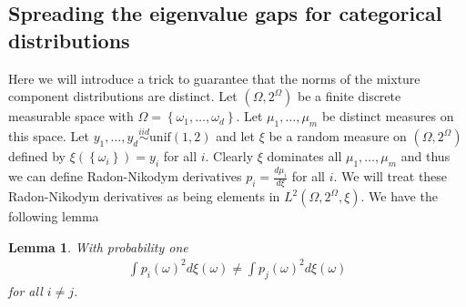 \documentclass[aos,preprint]{imsart}
\def\l{\left}
\def\r{\right}
\def\simiid{\overset{iid}{\sim}}
\theoremstyle{plain}
\newtheorem{lem}{Lemma}[section]
\theoremstyle{defintion}
\begin{document}
\subsection{Spreading the eigenvalue gaps for categorical distributions} \label{sec:eigspread}
Here we will introduce a trick to guarantee that the norms of the mixture component distributions are distinct. Let $\left( \Omega, 2^\Omega \right)$ be a finite discrete measurable space with $\Omega = \l\{\omega_1,\ldots,\omega_d\r\}$. Let $\mu_1,\ldots,\mu_m$ be distinct measures on this space. Let $y_1,\ldots, y_d\simiid \text{unif}\left( 1,2 \right)$ and let $\xi$ be a random measure on $\left( \Omega,2^\Omega \right)$ defined by $\xi\l(\left\{ \omega_i \right\}\r) = y_i$ for all $i$. Clearly $\xi$ dominates all $\mu_1,\ldots,\mu_m$ and thus we can define Radon-Nikodym derivatives $p_i = \frac{d\mu_i}{d \xi}$ for all $i$. We will treat these Radon-Nikodym derivatives as being elements in $L^2\left( \Omega, 2^\Omega, \xi \right)$. We have the following lemma
\begin{lem} \label{lem:distinctnorm}
	With probability one
	\begin{eqnarray*}
		\int p_i(\omega)^2 d\xi(\omega) \neq \int p_j(\omega)^2 d\xi(\omega)
	\end{eqnarray*}
	for all $i\neq j$.
\end{lem}
\end{document}
